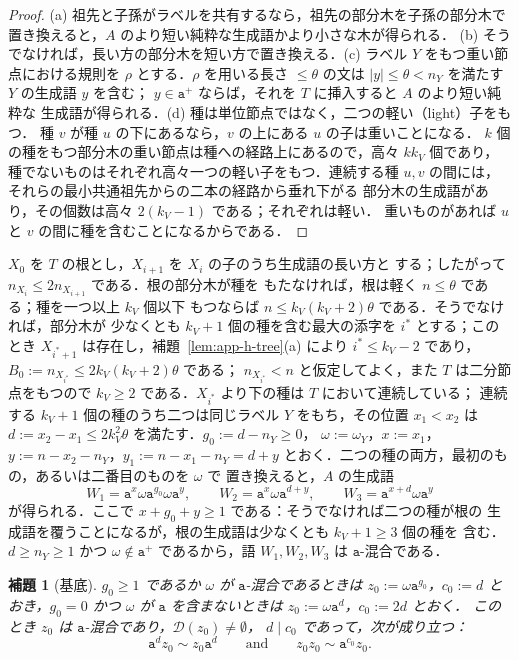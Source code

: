 \documentclass[11pt,a4paper]{ltjsarticle}
\numberwithin{equation}{section}
\theoremstyle{plain}
\newtheorem{lemma}[theorem]{補題}
\theoremstyle{definition}
\theoremstyle{remark}
\theoremstyle{plain}
\newcommand{\D}{\mathcal{D}}
\begin{document}
\begin{proof}
(a) 祖先と子孫がラベルを共有するなら，祖先の部分木を子孫の部分木で
置き換えると，$A$ のより短い純粋な生成語かより小さな木が得られる．
(b) そうでなければ，長い方の部分木を短い方で置き換える．(c) ラベル $Y$
をもつ重い節点における規則を $\rho$ とする．$\rho$ を用いる長さ
$\le\theta$ の文は $|y|\le\theta<n_Y$ を満たす $Y$ の生成語 $y$ を含む；
$y\in\mathtt a^+$ ならば，それを $T$ に挿入すると $A$ のより短い純粋な
生成語が得られる．(d) 種は単位節点ではなく，二つの軽い（light）子をもつ．
種 $v$ が種 $u$ の下にあるなら，$v$ の上にある $u$ の子は重いことになる．
$k$ 個の種をもつ部分木の重い節点は種への経路上にあるので，高々 $kk_V$
個であり，種でないものはそれぞれ高々一つの軽い子をもつ．連続する種
$u,v$ の間には，それらの最小共通祖先からの二本の経路から垂れ下がる
部分木の生成語があり，その個数は高々 $2(k_V-1)$ である；それぞれは軽い．
重いものがあれば $u$ と $v$ の間に種を含むことになるからである．
\end{proof}

$X_0$ を $T$ の根とし，$X_{i+1}$ を $X_i$ の子のうち生成語の長い方と
する；したがって $n_{X_i}\le2n_{X_{i+1}}$ である．根の部分木が種を
もたなければ，根は軽く $n\le\theta$ である；種を一つ以上 $k_V$ 個以下
もつならば $n\le k_V(k_V+2)\theta$ である．そうでなければ，部分木が
少なくとも $k_V+1$ 個の種を含む最大の添字を $i^*$ とする；このとき
$X_{i^*+1}$ は存在し，補題~\ref{lem:app-h-tree}(a) により
$i^*\le k_V-2$ であり，$B_0:=n_{X_{i^*}}\le2k_V(k_V+2)\theta$ である；
$n_{X_{i^*}}<n$ と仮定してよく，また $T$ は二分節点をもつので
$k_V\ge2$ である．$X_{i^*}$ より下の種は $T$ において連続している；
連続する $k_V+1$ 個の種のうち二つは同じラベル $Y$ をもち，その位置
$x_1<x_2$ は $d:=x_2-x_1\le2k_V^2\theta$ を満たす．$g_0:=d-n_Y\ge0$，
$\omega:=\omega_Y$，$x:=x_1$，$y:=n-x_2-n_Y$，$y_1:=n-x_1-n_Y=d+y$
とおく．二つの種の両方，最初のもの，あるいは二番目のものを $\omega$ で
置き換えると，$A$ の生成語
\[
 W_1=\mathtt a^x\omega\mathtt a^{g_0}\omega\mathtt a^y,\qquad
 W_2=\mathtt a^x\omega\mathtt a^{d+y},\qquad
 W_3=\mathtt a^{x+d}\omega\mathtt a^y
\]
が得られる．ここで $x+g_0+y\ge1$ である：そうでなければ二つの種が根の
生成語を覆うことになるが，根の生成語は少なくとも $k_V+1\ge3$ 個の種を
含む．$d\ge n_Y\ge1$ かつ $\omega\notin\mathtt a^+$ であるから，語
$W_1,W_2,W_3$ は $\mathtt a$-混合である．

\begin{lemma}[基底]
\label{lem:app-h-base}
$g_0\ge1$ であるか $\omega$ が $\mathtt a$-混合であるときは
$z_0:=\omega\mathtt a^{g_0}$，$c_0:=d$ とおき，$g_0=0$ かつ $\omega$ が
$\mathtt a$ を含まないときは $z_0:=\omega\mathtt a^d$，$c_0:=2d$ とおく．
このとき $z_0$ は $\mathtt a$-混合であり，$\D(z_0)\ne\emptyset$，
$d\mid c_0$ であって，次が成り立つ：
\[
 \mathtt a^dz_0\sim z_0\mathtt a^d\qquad\text{and}\qquad z_0z_0\sim\mathtt a^{c_0}z_0.
\]
\end{lemma}
\end{document}
